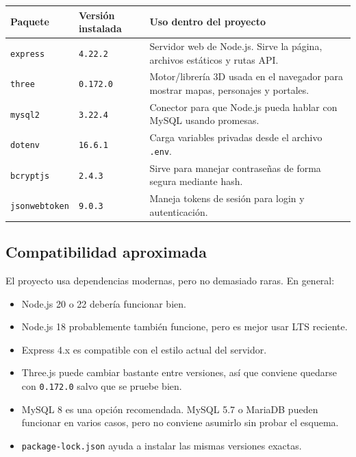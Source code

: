\documentclass[12pt,letterpaper]{article}
\begin{document}
\begin{longtable}{|>{\raggedright\arraybackslash}p{3.2cm}|>{\raggedright\arraybackslash}p{3cm}|>{\raggedright\arraybackslash}p{7cm}|}
\hline
\textbf{Paquete} & \textbf{Versión instalada} & \textbf{Uso dentro del proyecto} \\
\hline
\endhead
\texttt{express} & \texttt{4.22.2} & Servidor web de Node.js. Sirve la página, archivos estáticos y rutas API. \\
\hline
\texttt{three} & \texttt{0.172.0} & Motor/librería 3D usada en el navegador para mostrar mapas, personajes y portales. \\
\hline
\texttt{mysql2} & \texttt{3.22.4} & Conector para que Node.js pueda hablar con MySQL usando promesas. \\
\hline
\texttt{dotenv} & \texttt{16.6.1} & Carga variables privadas desde el archivo \texttt{.env}. \\
\hline
\texttt{bcryptjs} & \texttt{2.4.3} & Sirve para manejar contraseñas de forma segura mediante hash. \\
\hline
\texttt{jsonwebtoken} & \texttt{9.0.3} & Maneja tokens de sesión para login y autenticación. \\
\hline
\end{longtable}

\subsection{Compatibilidad aproximada}

El proyecto usa dependencias modernas, pero no demasiado raras. En general:

\begin{itemize}
  \item Node.js 20 o 22 debería funcionar bien.
  \item Node.js 18 probablemente también funcione, pero es mejor usar LTS reciente.
  \item Express 4.x es compatible con el estilo actual del servidor.
  \item Three.js puede cambiar bastante entre versiones, así que conviene quedarse con \texttt{0.172.0} salvo que se pruebe bien.
  \item MySQL 8 es una opción recomendada. MySQL 5.7 o MariaDB pueden funcionar en varios casos, pero no conviene asumirlo sin probar el esquema.
  \item \texttt{package-lock.json} ayuda a instalar las mismas versiones exactas.
\end{itemize}
\end{document}
